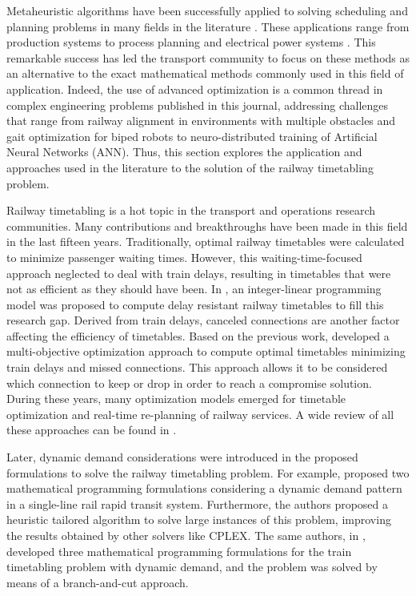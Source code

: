 \documentclass[Afour,sagev,times]{sagej}
\begin{document}
Metaheuristic algorithms have been successfully applied to solving scheduling and planning problems in many fields in the literature \cite{Zarandi20}. These applications range from production systems \cite{Neufeld23} to process planning \cite{Li15} and electrical power systems \cite{Morquecho24}. This remarkable success has led the transport community to focus on these methods as an alternative to the exact mathematical methods commonly used in this field of application. Indeed, the use of advanced optimization is a common thread in complex engineering problems published in this journal, addressing challenges that range from railway alignment in environments with multiple obstacles \cite{Wan24} and gait optimization for biped robots \cite{Liu24} to neuro-distributed training of Artificial Neural Networks (ANN)\cite{Michailidis24}. Thus, this section explores the application and approaches used in the literature to the solution of the railway timetabling problem.

Railway timetabling is a hot topic in the transport and operations research communities. Many contributions and breakthroughs have been made in this field in the last fifteen years. Traditionally, optimal railway timetables were calculated to minimize passenger waiting times. However, this waiting-time-focused approach neglected to deal with train delays, resulting in timetables that were not as efficient as they should have been. In \cite{Liebchen2010}, an integer-linear programming model was proposed to compute delay resistant railway timetables to fill this research gap. Derived from train delays, canceled connections are another factor affecting the efficiency of timetables. Based on the previous work, \cite{Corman2012} developed a multi-objective optimization approach to compute optimal timetables minimizing train delays and missed connections. This approach allows it to be considered which connection to keep or drop in order to reach a compromise solution. During these years, many optimization models emerged for timetable optimization and real-time re-planning of railway services. A wide review of all these approaches can be found in \cite{Cacchiani2014}.

Later, dynamic demand considerations were introduced in the proposed formulations to solve the railway timetabling problem. For example, \cite{Barrena2014} proposed two mathematical programming formulations considering a dynamic demand pattern in a single-line rail rapid transit system. Furthermore, the authors proposed a heuristic tailored algorithm to solve large instances of this problem, improving the results obtained by other solvers like CPLEX. The same authors, in \cite{Barrena2014_2}, developed three mathematical programming formulations for the train timetabling problem with dynamic demand, and the problem was solved by means of a branch-and-cut approach.
\end{document}
